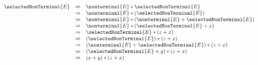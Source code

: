  \[
  \begin{array}{rcl}
    \selectedNonTerminal{E} &\Rightarrow& \nonterminal{E} * \selectedNonTerminal{E} \\
      &\Rightarrow& \nonterminal{E} * ( \selectedNonTerminal{E} )\\
      &\Rightarrow& \nonterminal{E} * ( \nonterminal{E} + \selectedNonTerminal{E} )\\
      &\Rightarrow& \nonterminal{E} * ( \selectedNonTerminal{E} + x )\\
      &\Rightarrow& \selectedNonTerminal{E} * ( z + x ) \\
      &\Rightarrow& (\selectedNonTerminal{E}) * ( z + x )\\
      &\Rightarrow& (\nonterminal{E} + \selectedNonTerminal{E} )*(z+x)\\
      &\Rightarrow& (\selectedNonTerminal{E}+y)*(z+x)\\
      &\Rightarrow& (x+y)*(z+x)\\
  \end{array}
  \]